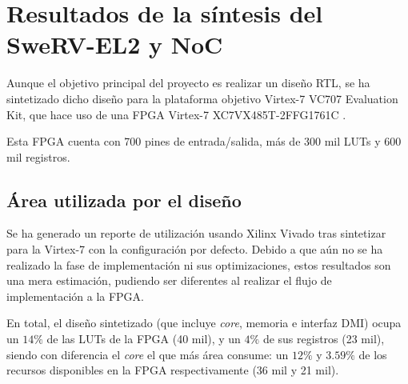 \chapter{Resultados de la síntesis del SweRV-EL2 y NoC}

Aunque el objetivo principal del proyecto es realizar un diseño RTL, se ha sintetizado dicho diseño para la plataforma objetivo Virtex-7 VC707 Evaluation Kit, que hace uso de una FPGA Virtex-7 XC7VX485T-2FFG1761C \cite{XilinxVC707}.

Esta FPGA cuenta con 700 pines de entrada/salida, más de 300 mil LUTs y 600 mil registros.

\section{Área utilizada por el diseño}
Se ha generado un reporte de utilización usando Xilinx Vivado tras sintetizar para la Virtex-7 con la configuración por defecto. Debido a que aún no se ha realizado la fase de implementación ni sus optimizaciones, estos resultados son una mera estimación, pudiendo ser diferentes al realizar el flujo de implementación a la FPGA.

En total, el diseño sintetizado (que incluye \textit{core}, memoria e interfaz DMI) ocupa un $14\%$ de las LUTs de la FPGA (40 mil), y un $4\%$ de sus registros (23 mil), siendo con diferencia el \textit{core} el que más área consume: un $12\%$ y $3.59\%$ de los recursos disponibles en la FPGA respectivamente (36 mil y 21 mil).


